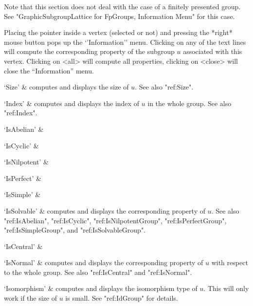 Note that this section does not deal with the case of a finitely presented
group. See "GraphicSubgroupLattice for FpGroups, Information Menu" for this 
case.

Placing the pointer  inside a vertex (selected  or not)  and pressing the
*right* mouse button pops up the  `'Information'' menu.  Clicking on any of
the text  lines will compute  the corresponding  property of the subgroup
$u$ associated  with  this vertex.  Clicking   on <all> will  compute all
properties, clicking on <close> will close the ``Information'' menu.

\beginitems
`Size' &
computes and displays the size of $u$.  See also "ref:Size".

`Index' &
computes and displays the  index  of $u$ in   the whole group.  See  also
"ref:Index".

`IsAbelian' &

`IsCyclic' &

`IsNilpotent' &

`IsPerfect' &

`IsSimple' &

`IsSolvable' &
computes and displays the corresponding property of $u$.  See also
"ref:IsAbelian", "ref:IsCyclic", "ref:IsNilpotentGroup", "ref:IsPerfectGroup",
"ref:IsSimpleGroup", and "ref:IsSolvableGroup".

`IsCentral' &

`IsNormal' &
computes and displays the corresponding  property of $u$ with respect  to
the whole group.  See also "ref:IsCentral" and "ref:IsNormal".

`Isomorphism' &
computes and displays  the isomorphism type of  $u$.  This will only work
if the size of $u$ is small.  See "ref:IdGroup" for details.
\enditems

%
%
%
%
%
%
%
%
%
%


